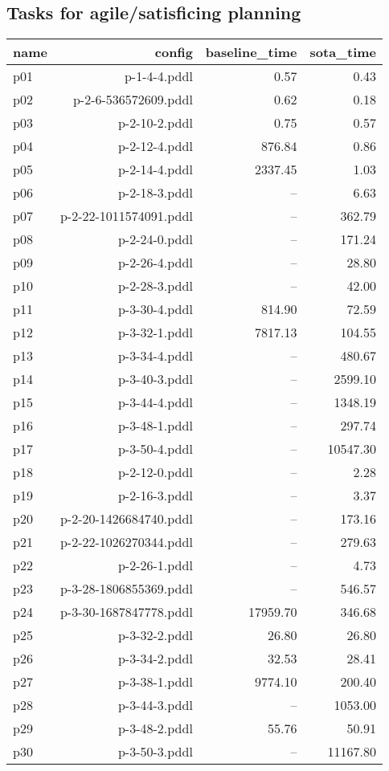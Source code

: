 \documentclass{article}
\begin{document}
                    \subsection*{Tasks for agile/satisficing planning}
                    
                            \begin{center}
                            \scriptsize
                            \begin{tabular}{@{}l|r|r|r@{}}
                            name & config & baseline\_time & sota\_time\\\midrule
                              p01& p-1-4-4.pddl&0.57&0.43\\
  p02& p-2-6-536572609.pddl&0.62&0.18\\
  p03& p-2-10-2.pddl&0.75&0.57\\
  p04& p-2-12-4.pddl&876.84&0.86\\
  p05& p-2-14-4.pddl&2337.45&1.03\\
  p06& p-2-18-3.pddl&--&6.63\\
  p07& p-2-22-1011574091.pddl&--&362.79\\
  p08& p-2-24-0.pddl&--&171.24\\
  p09& p-2-26-4.pddl&--&28.80\\
  p10& p-2-28-3.pddl&--&42.00\\
  p11& p-3-30-4.pddl&814.90&72.59\\
  p12& p-3-32-1.pddl&7817.13&104.55\\
  p13& p-3-34-4.pddl&--&480.67\\
  p14& p-3-40-3.pddl&--&2599.10\\
  p15& p-3-44-4.pddl&--&1348.19\\
  p16& p-3-48-1.pddl&--&297.74\\
  p17& p-3-50-4.pddl&--&10547.30\\
  p18& p-2-12-0.pddl&--&2.28\\
  p19& p-2-16-3.pddl&--&3.37\\
  p20& p-2-20-1426684740.pddl&--&173.16\\
  p21& p-2-22-1026270344.pddl&--&279.63\\
  p22& p-2-26-1.pddl&--&4.73\\
  p23& p-3-28-1806855369.pddl&--&546.57\\
  p24& p-3-30-1687847778.pddl&17959.70&346.68\\
  p25& p-3-32-2.pddl&26.80&26.80\\
  p26& p-3-34-2.pddl&32.53&28.41\\
  p27& p-3-38-1.pddl&9774.10&200.40\\
  p28& p-3-44-3.pddl&--&1053.00\\
  p29& p-3-48-2.pddl&55.76&50.91\\
  p30& p-3-50-3.pddl&--&11167.80
                            \end{tabular}
                            \end{center}
                    
\end{document}
